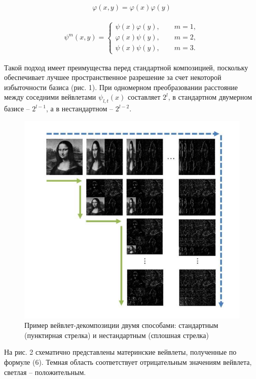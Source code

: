 \documentclass[a4paper, 14pt]{extarticle}	%
\begin{document}
\begin{gather}
\varphi(x,y)=\varphi(x)\varphi(y)
\end{gather}

\begin{gather}
\psi^m(x,y) =
  \begin{cases}
    \psi(x)\varphi(y),\qquad m=1,\\
    \varphi(x)\psi(y),\qquad m=2,\\
    \psi(x)\psi(y),\qquad m=3.
 \end{cases}
\end{gather}

Такой подход имеет преимущества перед стандартной композицией, поскольку обеспечивает лучшее пространственное разрешение за счет некоторой избыточности базиса (рис. 1). При одномерном преобразовании расстояние между соседними вейвлетами $\psi_{l,t}(x)$ составляет $2^l$, в стандартном двумерном базисе -- $2^{l-1}$, а в нестандартном -- $2^{l-2}$.

\begin{figure}[h!]
\centering
\includegraphics[scale=0.6]{res/pic001}
\caption{Пример вейвлет-декомпозиции двумя способами: стандартным (пунктирная стрелка) и нестандартным (сплошная стрелка)}
\end{figure}

На рис. 2 схематично представлены материнские вейвлеты, полученные по формуле (6). Темная область соответствует отрицательным значениям вейвлета, светлая -- положительным.
\end{document}
